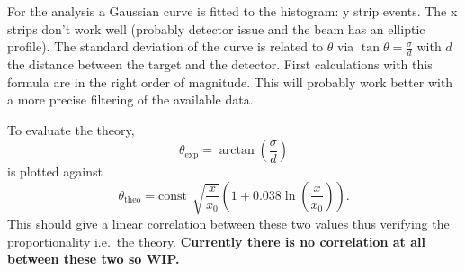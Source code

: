 \documentclass[sn-mathphys-num,iicol]{sn-jnl}
\theoremstyle{thmstyleone}
\theoremstyle{thmstyletwo}
\theoremstyle{thmstylethree}
\begin{document}
For the analysis a Gaussian curve is fitted to the histogram: y strip events.
The x strips don't work well (probably detector issue and the beam has an elliptic profile).
The standard deviation of the curve is related to $\theta $ via $\tan \theta =\tfrac{\sigma }{d}$ with $d$ the distance between the target and the detector.
First calculations with this formula are in the right order of magnitude.
This will probably work better with a more precise filtering of the available data.

To evaluate the theory, $$\theta _\text{exp}=\arctan\left(\dfrac{\sigma }{d}\right)$$ is plotted against $$\theta _\text{theo}=\text{const}\,\sqrt[]{\dfrac{x}{x_0}}\left(1+0.038\ln\left(\dfrac{x}{x_0}\right)\right).$$
This should give a linear correlation between these two values thus verifying the proportionality i.e.\ the theory.
\textbf{Currently there is no correlation at all between these two so WIP.}


\end{document}
